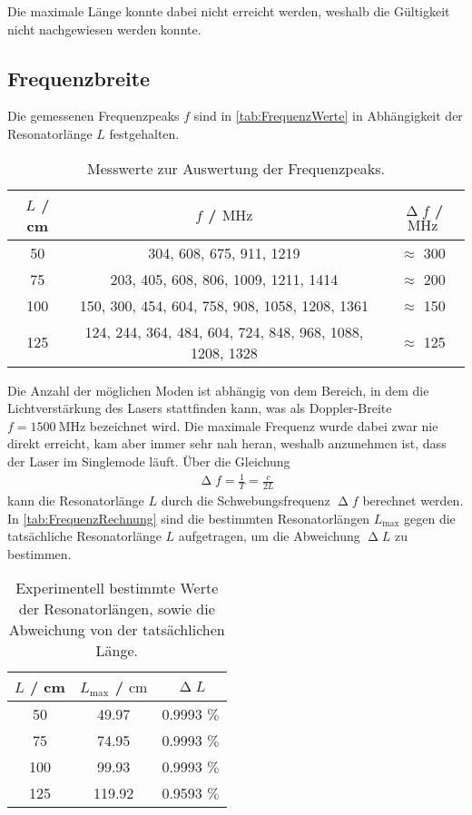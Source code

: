 \noindent
Die maximale Länge konnte dabei nicht erreicht werden, weshalb die Gültigkeit nicht nachgewiesen werden konnte.

\subsection{Frequenzbreite}
\label{subsec:Frequenzbreite}

Die gemessenen Frequenzpeaks $f$ sind in \autoref{tab:FrequenzWerte} in Abhängigkeit der Resonatorlänge $L$ festgehalten.

\begin{table}[H]
  \centering
  \caption{Messwerte zur Auswertung der Frequenzpeaks.}
  \label{tab:FrequenzWerte}
  \begin{tabular}{c c c}
      \toprule
      $L$ / cm & $f$ / $\si{\mega\hertz}$ & $\upDelta f$ / $\si{\mega\hertz}$ \\
      \midrule
      50 & 304, 608, 675, 911, 1219 & $\approx$ 300 \\
      75 & 203, 405, 608, 806, 1009, 1211, 1414 & $\approx$ 200 \\
      100 & 150, 300, 454, 604, 758, 908, 1058, 1208, 1361 & $\approx$ 150 \\
      125 & 124, 244, 364, 484, 604, 724, 848, 968, 1088, 1208, 1328 & $\approx$ 125 \\
      \bottomrule
  \end{tabular}
\end{table}

\noindent
Die Anzahl der möglichen Moden ist abhängig von dem Bereich, in dem die Lichtverstärkung des Lasers stattfinden kann, was als Doppler-Breite $f=\SI{1500}{\mega\hertz}$ bezeichnet wird.
Die maximale Frequenz wurde dabei zwar nie direkt erreicht, kam aber immer sehr nah heran, weshalb anzunehmen ist, dass der Laser im Singlemode läuft.
Über die Gleichung
\begin{align}
  \upDelta f = \frac{1}{T} = \frac{c}{2L}
\end{align}
kann die Resonatorlänge $L$ durch die Schwebungsfrequenz $\upDelta f$ berechnet werden. In \autoref{tab:FrequenzRechnung} sind die bestimmten Resonatorlängen $L_\text{max}$ gegen die 
tatsächliche Resonatorlänge $L$ aufgetragen, um die Abweichung $\upDelta L$ zu bestimmen.

\begin{table}[H]
  \centering
  \caption{Experimentell bestimmte Werte der Resonatorlängen, sowie die Abweichung von der tatsächlichen Länge.}
  \label{tab:FrequenzRechnung}
  \begin{tabular}{c c c}
      \toprule
      $L$ / cm & $L_\text{max}$ / $\si{\centi\meter}$ & $\upDelta L$\\
      \midrule
      50 & 49.97 & 0.9993 $\%$ \\
      75 & 74.95 & 0.9993 $\%$ \\
      100 & 99.93 & 0.9993 $\%$ \\
      125 & 119.92 & 0.9593 $\%$ \\
      \bottomrule
  \end{tabular}
\end{table}